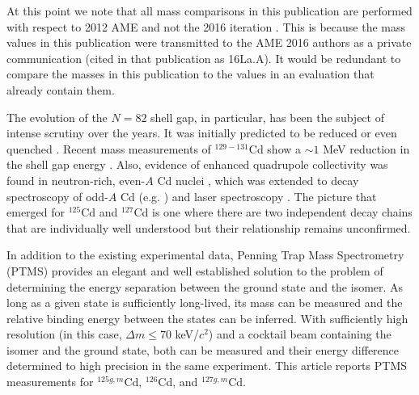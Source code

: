 \documentclass[twocolumn,prc,showpacs,preprintnumbers,amsmath,amssymb,superscriptaddress,nofootinbib,aps,10pt]{revtex4-1}
\begin{document}
At this point we note that all mass comparisons in this publication are performed with respect to 2012 AME \cite{Audi2012,Wang2012} and not the 2016 iteration \cite{Huang2017,Huang2017a}. This is because the mass values in this publication were transmitted to the AME 2016 authors as a private communication (cited in that publication as 16La.A). It would be redundant to compare the masses in this publication to the values in an evaluation that already contain them.

The evolution of the $N=82$ shell gap, in particular, has been the subject of intense scrutiny over the years. It was initially predicted to be reduced or even quenched \cite{Dobaczewski1994,Dillmann2003}. Recent mass measurements of $^{129-131}$Cd show a $\sim 1$ MeV reduction in the shell gap energy \cite{Atanasov2015,Knobel2016}. Also, evidence of enhanced quadrupole collectivity was found in neutron-rich, even-$A$ Cd nuclei \cite{Caceres2009,Kautzsch2000}, which was extended to decay spectroscopy of odd-$A$ Cd (e.g. \cite{Naqvi2010}) and laser spectroscopy \cite{Yordanov2013}. The picture that emerged for $^{125}$Cd and $^{127}$Cd is one where there are two independent decay chains that are individually well understood but their relationship remains unconfirmed.

In addition to the existing experimental data, Penning Trap Mass Spectrometry (PTMS) provides an elegant and well established solution \cite{Blaum2012} to the problem of determining the energy separation between the ground state and the isomer. As long as a given state is sufficiently long-lived, its mass can be measured and the relative binding energy between the states can be inferred. With sufficiently high resolution (in this case, $\Delta m \leq 70$ keV/$c^2$) and a cocktail beam containing  the isomer and the ground state, both can be measured and their energy difference determined to high precision in the same experiment. This article reports PTMS measurements for $^{125g,m}$Cd, $^{126}$Cd, and $^{127g,m}$Cd.
\end{document}

